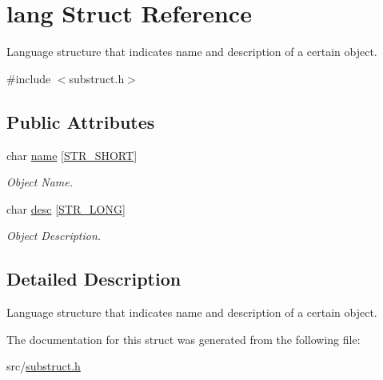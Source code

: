 \hypertarget{structlang}{}\section{lang Struct Reference}
\label{structlang}


Language structure that indicates name and description of a certain object.  




{\ttfamily \#include $<$substruct.\+h$>$}

\subsection*{Public Attributes}
\begin{DoxyCompactItemize}
\item 
\mbox{\label{structlang_aa14f80ea4ee3d9314a8c3a454fbd6178}} 
char \hyperlink{structlang_aa14f80ea4ee3d9314a8c3a454fbd6178}{name} \mbox{[}\hyperlink{common_8h_adea6e0778ed738e315a134cb865c141f}{S\+T\+R\+\_\+\+S\+H\+O\+RT}\mbox{]}
\begin{DoxyCompactList}\small\item\em Object Name. \end{DoxyCompactList}\item 
\mbox{\label{structlang_af96f66d59e2344cea9aaeae828eecdc4}} 
char \hyperlink{structlang_af96f66d59e2344cea9aaeae828eecdc4}{desc} \mbox{[}\hyperlink{common_8h_a44318a4127425708d1a624818539430f}{S\+T\+R\+\_\+\+L\+O\+NG}\mbox{]}
\begin{DoxyCompactList}\small\item\em Object Description. \end{DoxyCompactList}\end{DoxyCompactItemize}


\subsection{Detailed Description}
Language structure that indicates name and description of a certain object. 

The documentation for this struct was generated from the following file\+:\begin{DoxyCompactItemize}
\item 
src/\hyperlink{substruct_8h}{substruct.\+h}\end{DoxyCompactItemize}
